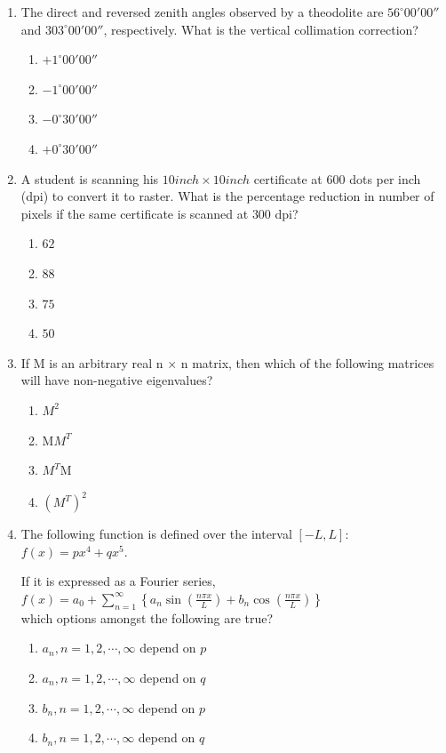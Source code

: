 \documentclass{exam}
\begin{document}
\begin{enumerate}
\item The direct and reversed zenith angles observed by a theodolite are $56^\circ 00' 00''$ and $303^\circ 00' 00''$, respectively. What is the vertical collimation correction?

\begin{enumerate}
    \item $+1^\circ 00' 00''$
    \item $-1^\circ 00' 00''$
    \item $-0^\circ 30' 00''$
    \item $+0^\circ 30' 00''$
\end{enumerate}
\vspace{0.5cm}

\item A student is scanning his $10 inch × 10 inch$ certificate at $600$ dots per inch (dpi) to convert it to raster. What is the percentage reduction in number of pixels if the same certificate is scanned at $300$ dpi?
\begin{enumerate}
    \item $62$
    \item $88$
    \item $75$
    \item $50$
\end{enumerate}
\vspace{0.5cm}

\item If M is an arbitrary real n × n matrix, then which of the following matrices will have non-negative eigenvalues?
\begin{enumerate}
    \item $M^2$
    \item M$M^T$
    \item $M^T$M
    \item $(M^T)^2$
\end{enumerate}
\vspace{0.5cm}

\item The following function is defined over the interval $[-L, L]$:\\
$f(x) = px^4 + qx^5.$

If it is expressed as a Fourier series,\\
$f(x) = a_0 + \sum_{n=1}^{\infty} \left\{ a_n \sin\left(\frac{n\pi x}{L}\right) + b_n \cos\left(\frac{n\pi x}{L}\right) \right\}$\\
which options amongst the following are true?

\begin{enumerate}
    \item $a_n, n=1,2,\cdots,\infty$ depend on $p$
    \item $a_n, n=1,2,\cdots,\infty$ depend on $q$
    \item $b_n, n=1,2,\cdots,\infty$ depend on $p$
    \item $b_n, n=1,2,\cdots,\infty$ depend on $q$
\end{enumerate}


\end{enumerate}
\end{document}
